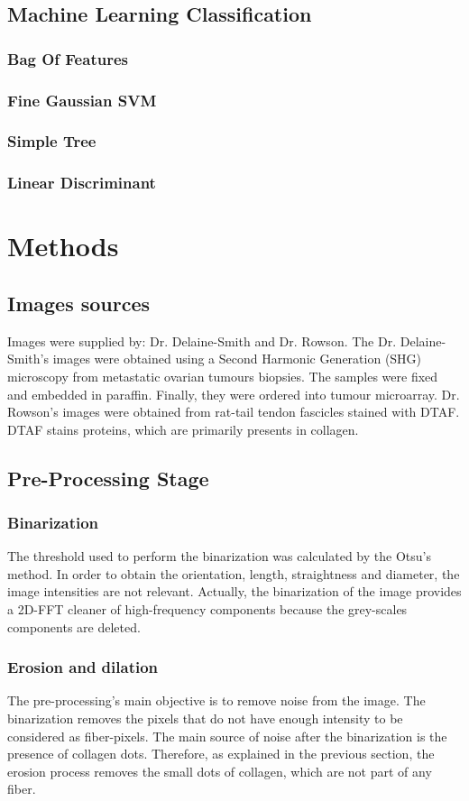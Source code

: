 \documentclass[12pt,a4paper]{article}
\begin{document}
\subsection{Machine Learning Classification}
\subsubsection{Bag Of Features}
\subsubsection{Fine Gaussian SVM}
\subsubsection{Simple Tree}
\subsubsection{Linear Discriminant}

\section{Methods}
\subsection{Images sources}
Images were supplied by: Dr. Delaine-Smith and Dr. Rowson. The  Dr. Delaine-Smith's images were obtained using a Second Harmonic Generation (SHG) microscopy from metastatic ovarian tumours biopsies. The samples were fixed and  embedded in paraffin. Finally, they were ordered into tumour microarray.  Dr. Rowson's images were obtained from rat-tail tendon fascicles stained with DTAF. DTAF stains proteins, which are primarily presents in collagen.

\subsection{Pre-Processing Stage}
\subsubsection{Binarization}
The threshold used to perform the binarization was calculated by the Otsu’s method. In order to obtain the orientation, length, straightness and diameter, the image intensities are not relevant. Actually, the binarization of the image provides a 2D-FFT cleaner of high-frequency components because the grey-scales components are deleted.
\subsubsection{Erosion and dilation}
The pre-processing's main objective is to remove noise from the image. The binarization removes the pixels that do not have enough intensity to be considered as fiber-pixels. The main source of noise after the binarization is the presence of collagen dots. Therefore, as explained in the previous section, the erosion process removes the small dots of collagen, which are not part of any fiber.
\end{document}
